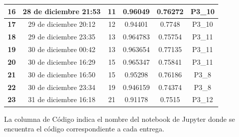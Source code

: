 \documentclass[a4paper,11pt]{article}
\begin{document}
\begin{table}[htbp]
\begin{center}
\begin{tabular}{|c|c|c|c|c|c|}
  		\textbf{16} & 28 de diciembre 21:53 & 11 & 0.96049 & 0.76272 & P3\_10 \\ \hline
  		\textbf{17} & 29 de diciembre 20:12 & 12 & 0.94401 & 0.7748 & P3\_10 \\ \hline
  		\textbf{18} & 29 de diciembre 23:35  & 13 & 0.964783 & 0.75754 & P3\_11 \\ \hline
  		\textbf{19} & 30 de diciembre 00:42  & 13 & 0.963654 & 0.77135 & P3\_11 \\ \hline
  		\textbf{20} & 30 de diciembre 16:29  & 15 & 0.965347 & 0.75841 & P3\_11 \\ \hline
  		\textbf{21} & 30 de diciembre 16:50 & 15 & 0.95298 & 0.76186 & P3\_8 \\ \hline
  		\textbf{22} & 30 de diciembre 23:34 & 19 & 0.946159 & 0.74374 & P3\_8 \\ \hline
  		\textbf{23} & 31 de diciembre 16:18 & 21 & 0.91178 & 0.7515 & P3\_12 \\ \hline
  	\end{tabular}\end{center}
  	\label{}
  \end{table}
  
  La columna de Código indica el nombre del notebook de Jupyter donde se encuentra el código correspondiente a cada entrega. 
\end{document}
